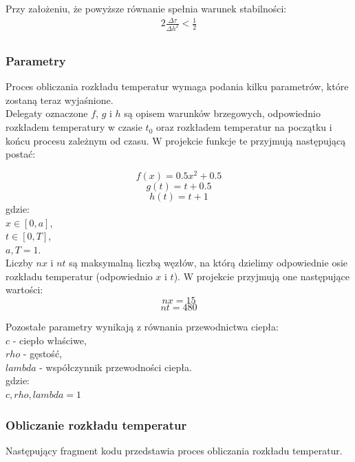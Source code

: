 \documentclass[twoside]{projektInzynierskiMS1}
\newcommand{\si}{ś}
\begin{document}
Przy założeniu, że powyższe równanie spełnia warunek stabilno\si ci:
\begin{alignat*}{2}
\frac{\Delta \tau}{\Delta h^2} < \frac{1}{2}\\
\end{alignat*}


\subsubsection{Parametry}
Proces obliczania rozkładu temperatur wymaga podania kilku parametrów, które zostaną teraz wyja\si nione. \\
Delegaty oznaczone $f$, $g$ i $h$ są opisem warunków brzegowych, odpowiednio rozkładem temperatury w czasie $t_0$ oraz rozkładem temperatur na początku i końcu procesu zależnym od czasu. W projekcie funkcje te przyjmują następującą postać:

\[ f(x) = 0.5 x^2 + 0.5 \] 
\[ g(t) = t + 0.5 \] 
\[ h(t) = t + 1 \] 
\noindent gdzie: \\
$ x \in [0, a] $, \\
$ t \in [0, T] $, \\
$ a, T = 1$. \\

Liczby $nx$ i $nt$ są maksymalną liczbą węzłów, na którą dzielimy odpowiednie osie rozkładu temperatur (odpowiednio $x$ i $t$). W projekcie przyjmują one następujące warto\si ci: 
\[ nx = 15 \]
\[nt = 480 \]

Pozostałe parametry wynikają z równania przewodnictwa ciepła: \\
$c$ - ciepło wła\si ciwe,\\
$rho$ - gęsto\si ć,\\
$lambda$ - współczynnik przewodno\si ci ciepła.\\

\noindent  gdzie: \\
$ c, rho, lambda = 1 $

\subsubsection{Obliczanie rozkładu temperatur}
Następujący fragment kodu przedstawia proces obliczania rozkładu temperatur.
\end{document}
